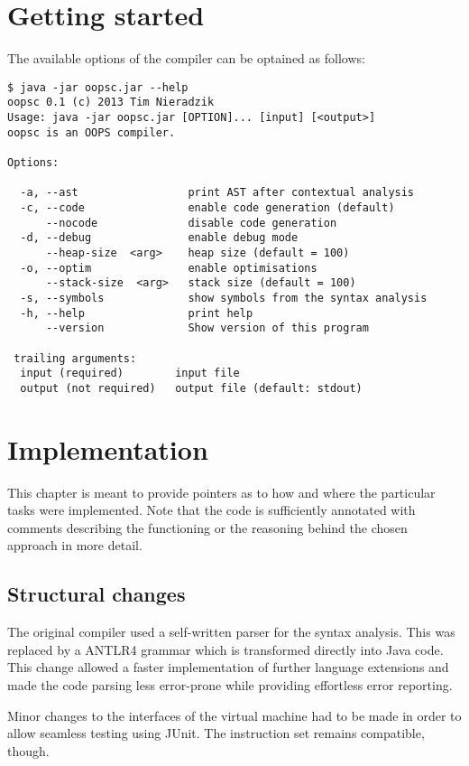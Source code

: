\documentclass{guide}
\begin{document}
\chapter{Getting started}
	The available options of the compiler can be optained as follows:

\begin{verbatim}
$ java -jar oopsc.jar --help
oopsc 0.1 (c) 2013 Tim Nieradzik
Usage: java -jar oopsc.jar [OPTION]... [input] [<output>]
oopsc is an OOPS compiler.

Options:

  -a, --ast                 print AST after contextual analysis
  -c, --code                enable code generation (default)
      --nocode              disable code generation
  -d, --debug               enable debug mode
      --heap-size  <arg>    heap size (default = 100)
  -o, --optim               enable optimisations
      --stack-size  <arg>   stack size (default = 100)
  -s, --symbols             show symbols from the syntax analysis
  -h, --help                print help
      --version             Show version of this program

 trailing arguments:
  input (required)        input file
  output (not required)   output file (default: stdout)
\end{verbatim}

\chapter{Implementation}
	This chapter is meant to provide pointers as to how and where the particular
	tasks were implemented. Note that the code is sufficiently annotated with
	comments describing the functioning or the reasoning behind the chosen approach
	in more detail.

	\section{Structural changes}
	The original compiler used a self-written parser for the syntax analysis. This
	was replaced by a ANTLR4 grammar which is transformed directly into Java code.
	This change allowed a faster implementation of further language extensions and
	made the code parsing less error-prone while providing effortless error
	reporting.

	Minor changes to the interfaces of the virtual machine had to be made in order
	to allow seamless testing using JUnit. The instruction set remains compatible,
	though.
\end{document}
